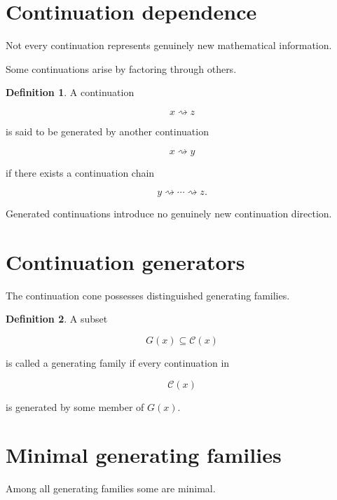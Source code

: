 \documentclass[13pt,openany]{book}
\theoremstyle{plain}
\theoremstyle{definition}
\newtheorem{definition}{Definition}[chapter]
\begin{document}
\section{Continuation dependence}

Not every continuation represents genuinely new mathematical information.

Some continuations arise by factoring through others.

\begin{definition}

A continuation

\[
x\rightsquigarrow z
\]

is said to be generated by another continuation

\[
x\rightsquigarrow y
\]

if there exists a continuation chain

\[
y
\rightsquigarrow
\cdots
\rightsquigarrow
z.
\]

\end{definition}

Generated continuations introduce no genuinely new continuation direction.


\section{Continuation generators}

The continuation cone possesses distinguished generating families.

\begin{definition}

A subset

\[
G(x)
\subseteq
\mathcal C(x)
\]

is called a generating family if every continuation in

\[
\mathcal C(x)
\]

is generated by some member of \(G(x)\).

\end{definition}


\section{Minimal generating families}

Among all generating families some are minimal.
\end{document}
